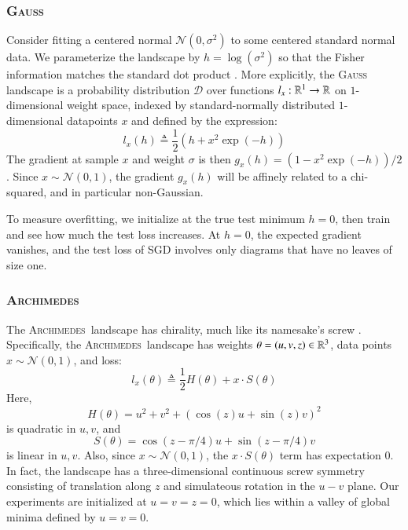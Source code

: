 \documentclass{article}
\theoremstyle{plain}
\theoremstyle{definition}
\newcommand{\wrap}[1]{\left(#1\right)}
\newcommand{\Dd}{\mathcal{D}}
\newcommand{\Nn}{\mathcal{N}}   \newcommand{\NN}{\mathbb{N}}
\newcommand{\Gauss}{\textsc{Gauss}}
\newcommand{\Archimedes}{\textsc{Archimedes}}
\begin{document}
        \subsubsection*{\Gauss}
            Consider fitting a centered normal $\Nn(0, \sigma^2)$ to some
            centered standard normal data.  We parameterize the landscape by
            $h=\log(\sigma^2)$ so that the Fisher information matches the
            standard dot product \citep{am98}.   
            More explicitly, the \Gauss\, landscape is a probability
            distribution $\Dd$ over functions $l_x:\mathbb{R}^1\to \mathbb{R}$ on
            $1$-dimensional weight space, indexed by standard-normally
            distributed $1$-dimensional datapoints $x$ and defined by the
            expression:
            $$
                l_x(h)
                \triangleq
                \frac{1}{2} \wrap{h + x^2 \exp(-h)}
            $$
            The gradient at sample $x$ and weight $\sigma$ is then $g_x(h) =
            (1-x^2\exp(-h))/2$.  Since $x\sim \Nn(0, 1)$, the gradient $g_x(h)$
            will be affinely related to a chi-squared, and in particular
            non-Gaussian.
            
            To measure overfitting, we initialize at the true test minimum
            $h=0$, then train and see how much the test loss increases.  At
            $h=0$, the expected gradient vanishes, and the test loss of SGD
            involves only diagrams that have no leaves of size one.
            
        \subsubsection*{\Archimedes}
            The \Archimedes\, landscape has chirality, much like its namesake's
            screw \cite{vi00}.  Specifically, the \Archimedes\ landscape has
            weights     $\theta = (u,v,z) \in \mathbb{R}^3$,
            data points $x \sim \Nn(0, 1)$,
            and loss:
            $$
                l_x(\theta)
                \triangleq
                \frac{1}{2} H(\theta) + x \cdot S(\theta)
            $$
            Here,
            $$
                H(\theta) = u^2 + v^2 + (\cos(z) u + \sin(z) v)^2
            $$
            is quadratic in $u, v$, and
            $$
                S(\theta) = \cos(z-\pi/4) u + \sin(z-\pi/4) v
            $$
            is linear in $u, v$.
            Also, since $x \sim \Nn(0,1)$, the $x \cdot S(\theta)$ term has
            expectation $0$.
            In fact, the landscape has a three-dimensional continuous screw
            symmetry consisting of translation along $z$ and simulateous
            rotation in the $u-v$ plane.  Our experiments are initialized at
            $u=v=z=0$, which lies within a valley of global minima defined by
            $u=v=0$.  
\end{document}
